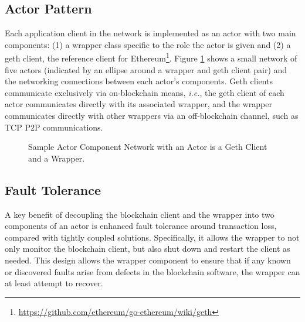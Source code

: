 \subsection{Actor Pattern}
Each application client in the network is implemented as an actor with two main components: (1) a wrapper class specific to the role the actor is given and (2) a geth client, the  reference client for Ethereum\footnote{\url{https://github.com/ethereum/go-ethereum/wiki/geth}}. Figure \ref{fig:network-component-topology} shows a small network of five actors (indicated by an ellipse around a wrapper and geth client pair) and the networking connections between each actor's components. Geth clients communicate exclusively via on-blockchain means,\textit{ i.e.}, the geth client of each actor communicates directly with its associated wrapper, and the wrapper  communicates directly with other wrappers via an off-blockchain channel, such as TCP P2P communications. 

\begin{figure}[ht]
\vspace{-0.10in}
	\centering
	
    \vspace{-0.05in}
	\caption{Sample Actor Component Network with an Actor is a Geth Client and a Wrapper.}
	\label{fig:network-component-topology}
    \vspace{-0.10in}
\end{figure}

\subsection{Fault Tolerance}

A key benefit of decoupling the blockchain client and the wrapper into two  components of an actor is enhanced fault tolerance around transaction loss, compared with tightly coupled solutions. Specifically, it allows the wrapper to not only monitor the blockchain client, but also shut down and restart the client as needed. This design allows the wrapper component to ensure that if any known or discovered faults arise from defects in the blockchain software, the wrapper can at least attempt to recover. 

